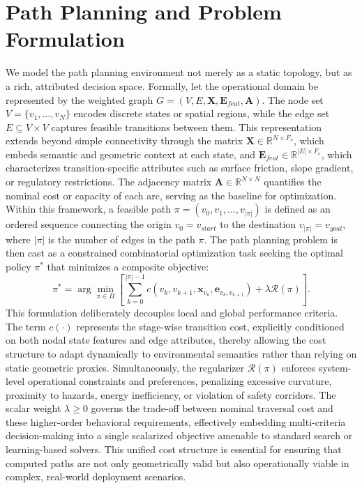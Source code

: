 \documentclass[twoside]{article}
\begin{document}
	\section{Path Planning and Problem Formulation}
	We model the path planning environment not merely as a static topology, but as a rich, attributed decision space. Formally, let the operational domain be represented by the weighted graph $G = (V, E, \mathbf{X}, \mathbf{E}_{feat}, \mathbf{A})$. The node set $V = \{v_1, \dots, v_N\}$ encodes discrete states or spatial regions, while the edge set $E \subseteq V \times V$ captures feasible transitions between them. This representation extends beyond simple connectivity through the matrix $\mathbf{X} \in \mathbb{R}^{N \times F_v}$, which embeds semantic and geometric context at each state, and $\mathbf{E}_{feat} \in \mathbb{R}^{|E| \times F_e}$, which characterizes transition-specific attributes such as surface friction, slope gradient, or regulatory restrictions. The adjacency matrix $\mathbf{A} \in \mathbb{R}^{N \times N}$ quantifies the nominal cost or capacity of each arc, serving as the baseline for optimization. 	
	Within this framework, a feasible path $\pi = (v_0, v_1, \dots, v_{|\pi|})$ is defined as an ordered sequence connecting the origin $v_0 = v_{start}$ to the destination $v_{|\pi|} = v_{goal}$, where $|\pi|$ is the number of edges in the path $\pi$. The path planning problem is then cast as a constrained combinatorial optimization task seeking the optimal policy $\pi^*$ that minimizes a composite objective:
	\begin{equation}\label{eq:path_cost}
		\pi^* = \arg\min_{\pi \in \Pi} \left[ \sum_{k=0}^{|\pi|-1} c(v_k, v_{k+1}, \mathbf{x}_{v_k}, \mathbf{e}_{v_k, v_{k+1}}) + \lambda \mathcal{R}(\pi) \right].
	\end{equation}
	This formulation deliberately decouples local and global performance criteria. The term $c(\cdot)$ represents the stage-wise transition cost, explicitly conditioned on both nodal state features and edge attributes, thereby allowing the cost structure to adapt dynamically to environmental semantics rather than relying on static geometric proxies. Simultaneously, the regularizer $\mathcal{R}(\pi)$ enforces system-level operational constraints and preferences, penalizing excessive curvature, proximity to hazards, energy inefficiency, or violation of safety corridors. The scalar weight $\lambda \geq 0$ governs the trade-off between nominal traversal cost and these higher-order behavioral requirements, effectively embedding multi-criteria decision-making into a single scalarized objective amenable to standard search or learning-based solvers. This unified cost structure is essential for ensuring that computed paths are not only geometrically valid but also operationally viable in complex, real-world deployment scenarios.
\end{document}
